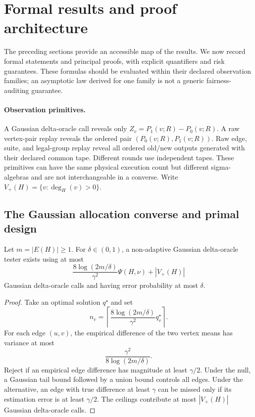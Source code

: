 \section{Formal results and proof architecture}
\label{sec:formal}
The preceding sections provide an accessible map of the results. We now record formal statements and principal proofs, with explicit quantifiers and risk guarantees. These formulas should be evaluated within their declared observation families; an asymptotic law derived for one family is not a generic fairness-auditing guarantee.

\paragraph{Observation primitives.}
A Gaussian delta-oracle call reveals only
$Z_v=P_1(v;R)-P_0(v;R)$.  A raw vertex-pair replay reveals the ordered pair
$(P_0(v;R),P_1(v;R))$.  Raw edge, suite, and legal-group replay reveal all
ordered old/new outputs generated with their declared common tape.  Different
rounds use independent tapes.  These primitives can have the same physical
execution count but different sigma-algebras and are not interchangeable in a
converse.  Write $V_+(H)=\{v:\deg_H(v)>0\}$.


\subsection{The Gaussian allocation converse and primal design}


\begin{theorem}
\label{thm:upper}
Let $m=|E(H)|\ge1$.  For $\delta\in(0,1)$, a non-adaptive Gaussian
delta-oracle tester exists using at
most
\begin{equation}\label{eq:formal-results-001}
\frac{8\log(2m/\delta)}{\gamma^2}\Psi(H,\nu)+|V_+(H)|
\end{equation}
Gaussian delta-oracle calls and having error probability at most $\delta$.
\end{theorem}

\begin{proof}
Take an optimal solution $q^\star$ and set
\begin{equation}\label{eq:formal-results-002}
n_v=\left\lceil
\frac{8\log(2m/\delta)}{\gamma^2}q_v^\star
\right\rceil.
\end{equation}
For each edge $(u,v)$, the empirical difference of the two vertex means has
variance at most
\begin{equation}\label{eq:formal-results-003}
\frac{\gamma^2}{8\log(2m/\delta)}.
\end{equation}
Reject if an empirical edge
difference has magnitude at least $\gamma/2$.  Under the null, a Gaussian tail
bound followed by a union bound controls all edges.  Under the alternative, an
edge with true difference at least $\gamma$ can be missed only if its estimation
error is at least $\gamma/2$.  The ceilings contribute at most $|V_+(H)|$
Gaussian delta-oracle calls.
\end{proof}


